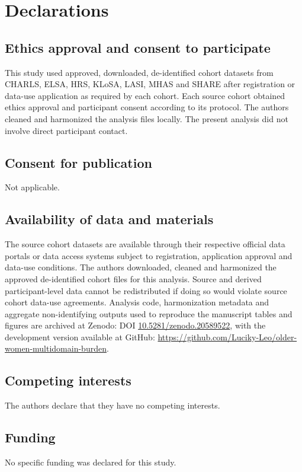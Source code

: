 \documentclass[pdflatex,sn-vancouver-num]{sn-jnl}
\begin{document}
\section*{Declarations}

\subsection*{Ethics approval and consent to participate}
This study used approved, downloaded, de-identified cohort datasets from CHARLS, ELSA, HRS, KLoSA, LASI, MHAS and SHARE after registration or data-use application as required by each cohort. Each source cohort obtained ethics approval and participant consent according to its protocol. The authors cleaned and harmonized the analysis files locally. The present analysis did not involve direct participant contact.

\subsection*{Consent for publication}
Not applicable.

\subsection*{Availability of data and materials}
The source cohort datasets are available through their respective official data portals or data access systems subject to registration, application approval and data-use conditions. The authors downloaded, cleaned and harmonized the approved de-identified cohort files for this analysis. Source and derived participant-level data cannot be redistributed if doing so would violate source cohort data-use agreements. Analysis code, harmonization metadata and aggregate non-identifying outputs used to reproduce the manuscript tables and figures are archived at Zenodo: DOI \href{https://doi.org/10.5281/zenodo.20589522}{10.5281/zenodo.20589522}, with the development version available at GitHub: \url{https://github.com/Luciky-Leo/older-women-multidomain-burden}.

\subsection*{Competing interests}
The authors declare that they have no competing interests.

\subsection*{Funding}
No specific funding was declared for this study.
\end{document}
